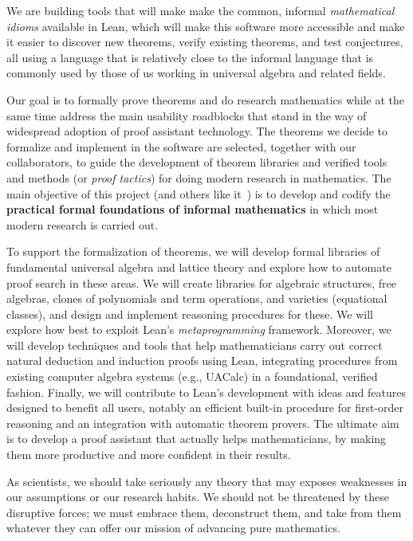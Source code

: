 \documentclass[11pt]{amsart}  %
\begin{document}
We are building tools that will make make the common, informal \emph{mathematical idioms} available in Lean, which will make this software more accessible and make it easier to discover new theorems, verify existing theorems, and test conjectures, all using a language that is relatively close to the informal language that is commonly used by those of us working in universal algebra and related fields.

Our goal is to formally prove theorems and do research mathematics while at the same time address the main usability roadblocks that stand in the way of widespread adoption of proof assistant technology.  The theorems we decide to formalize and implement in the software are selected, together with our collaborators, to guide the development of theorem libraries and verified tools and methods (or \emph{proof tactics}) for doing modern research in mathematics.  The main objective of this project (and others like it~\cite{lean-mathlib:2018,blanchette:2018}) is to develop and codify the \textbf{practical formal foundations of informal mathematics} in which most modern research is carried out.

To support the formalization of theorems, we will develop formal libraries of fundamental universal algebra
and lattice theory and explore how to automate proof search in these areas. We will
create libraries for algebraic structures, free algebras, clones of polynomials and term operations, 
and varieties (equational classes), and design and implement reasoning procedures for these.
We will explore how best to exploit Lean's \emph{metaprogramming} framework. Moreover, we will develop 
techniques and tools that help mathematicians carry out correct natural deduction and induction 
proofs using Lean, integrating procedures from existing computer algebra systems (e.g., UACalc) in a foundational, 
verified fashion. Finally, we will contribute to Lean's development with ideas and features designed
to benefit all users, notably an efficient built-in procedure for first-order reasoning and an integration 
with automatic theorem provers. The ultimate aim is to develop a proof assistant that actually helps 
mathematicians, by making them more productive and more confident in their results.

As scientists, we should take seriously any theory that 
may exposes weaknesses in our assumptions or our research habits.  We should
not be threatened by these disruptive forces; we must embrace them, deconstruct them,
and take from them whatever they can offer our mission of advancing pure mathematics.
\end{document}
